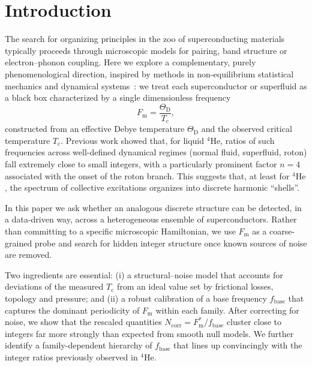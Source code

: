 \documentclass[aps,prb,twocolumn,superscriptaddress,floatfix,nofootinbib]{revtex4-2}
\newcommand{\Tc}{\ensuremath{T_{\mathrm{c}}}}
\newcommand{\ThetaD}{\ensuremath{\Theta_{\mathrm{D}}}}
\newcommand{\Fm}{\ensuremath{F_{\mathrm{m}}}}
\newcommand{\Fmstar}{\ensuremath{{F_{\mathrm{m}}^{\ast}}}}
\newcommand{\fbase}{\ensuremath{{f_{\mathrm{base}}}}}
\newcommand{\Ncorr}{\ensuremath{{N_{\mathrm{corr}}}}}
\newcommand{\He}{\ensuremath{\mathrm{He}}}
\newcommand{\HeFour}{\ensuremath{{^{4}\He}}}
\begin{document}
\maketitle

\section{Introduction}
\label{sec:intro}

The search for organizing principles in the zoo of superconducting
materials typically proceeds through microscopic models for pairing,
band structure or electron--phonon coupling.\cite{BCS1957,Tinkham1996}
Here we explore a complementary, purely phenomenological direction,
inspired by methods in non-equilibrium statistical mechanics and
dynamical systems~\cite{Mori1965,Zwanzig2001,Pikovsky2001,GuckenheimerHolmes1983}:
we treat each superconductor or superfluid as a black box characterized
by a single dimensionless frequency
\begin{equation}
  \Fm = \frac{\ThetaD}{\Tc},
\end{equation}
constructed from an effective Debye temperature $\ThetaD$ and
the observed critical temperature $\Tc$.
Previous work showed that, for liquid \HeFour, ratios of such
frequencies across well-defined dynamical regimes (normal fluid, superfluid, roton)
fall extremely close to small integers, with a particularly prominent
factor $n = 4$ associated with the onset of the roton branch.
This suggests that, at least for \HeFour, the spectrum of collective excitations
organizes into discrete harmonic ``shells''.

In this paper we ask whether an analogous discrete structure can be detected,
in a data-driven way, across a heterogeneous ensemble of superconductors.
Rather than committing to a specific microscopic Hamiltonian,
we use $\Fm$ as a coarse-grained probe and search for hidden
integer structure once known sources of noise are removed.

Two ingredients are essential:
(i) a structural--noise model that accounts for deviations of the
measured $\Tc$ from an ideal value set by frictional losses, topology
and pressure; and
(ii) a robust calibration of a base frequency $\fbase$ that captures
the dominant periodicity of $\Fm$ within each family.
After correcting for noise, we show that the rescaled quantities
$\Ncorr = \Fmstar / \fbase$ cluster close to integers
far more strongly than expected from smooth null models.
We further identify a family-dependent hierarchy of
$\fbase$ that lines up convincingly with the integer ratios
previously observed in \HeFour.
\end{document}
